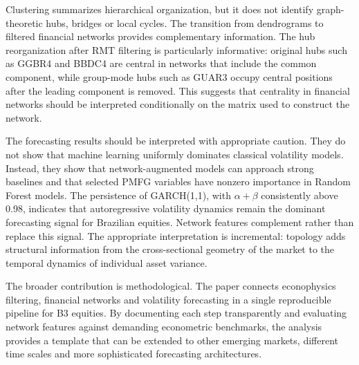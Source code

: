 Clustering summarizes hierarchical organization, but it does not identify graph-theoretic hubs, bridges or local cycles. The transition from dendrograms to filtered financial networks provides complementary information. The hub reorganization after RMT filtering is particularly informative: original hubs such as GGBR4 and BBDC4 are central in networks that include the common component, while group-mode hubs such as GUAR3 occupy central positions after the leading component is removed. This suggests that centrality in financial networks should be interpreted conditionally on the matrix used to construct the network.

The forecasting results should be interpreted with appropriate caution. They do not show that machine learning uniformly dominates classical volatility models. Instead, they show that network-augmented models can approach strong baselines and that selected PMFG variables have nonzero importance in Random Forest models. The persistence of GARCH(1,1), with $\alpha+\beta$ consistently above 0.98, indicates that autoregressive volatility dynamics remain the dominant forecasting signal for Brazilian equities. Network features complement rather than replace this signal. The appropriate interpretation is incremental: topology adds structural information from the cross-sectional geometry of the market to the temporal dynamics of individual asset variance.

The broader contribution is methodological. The paper connects econophysics filtering, financial networks and volatility forecasting in a single reproducible pipeline for B3 equities. By documenting each step transparently and evaluating network features against demanding econometric benchmarks, the analysis provides a template that can be extended to other emerging markets, different time scales and more sophisticated forecasting architectures.
